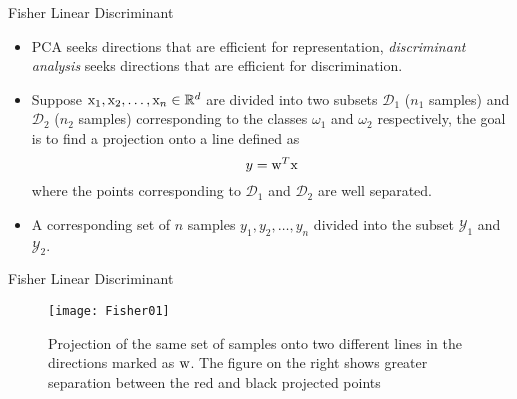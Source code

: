 \begin{frame}{Fisher Linear Discriminant}
\begin{itemize}
\item PCA seeks directions that are efficient for
representation, \textit{\color{mycolor2}discriminant analysis} seeks directions that are efficient for discrimination.
\item Suppose ${\rm x}_1,{\rm x}_2,\ldots,{\rm x}_n\in \mathbb{R}^d$ are divided into two subsets $\mathcal{D}_1$ ($n_1$  samples) and $\mathcal{D}_2$ ($n_2$  samples)
corresponding to the classes $\omega_1$ and $\omega_2$ respectively, the
goal is to find a projection onto a line defined as
\begin{equation}
{y}={\rm w}^T{\rm x} \nonumber
\end{equation}
where the points corresponding to $\mathcal{D}_1$ and $\mathcal{D}_2$ are well separated.
\item A corresponding set of $n$ samples ${y}_1,{y}_2,\ldots,{y}_n$ divided into the subset $\mathcal{Y}_1$ and $\mathcal{Y}_2$.\nocite{duda2012pattern}
\end{itemize}
\end{frame}


\begin{frame}{Fisher Linear Discriminant}
\begin{figure}
\texttt{[image: Fisher01]}
\caption{Projection of the same set of samples onto two different lines in the directions marked as ${\rm w}$. The figure on the right shows greater separation between the red and black projected points}
\end{figure}
\end{frame}

